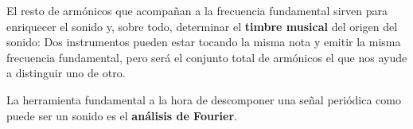 El resto de armónicos que acompañan a la frecuencia fundamental sirven
para enriquecer el sonido y, sobre todo, determinar el \textbf{timbre
  musical} del origen del sonido: Dos instrumentos pueden estar
tocando la misma nota y emitir la misma frecuencia fundamental, pero
será el conjunto total de armónicos el que nos ayude a distinguir uno
de otro.

La herramienta fundamental a la hora de descomponer una señal
periódica como puede ser un sonido es el \textbf{análisis de Fourier}.




